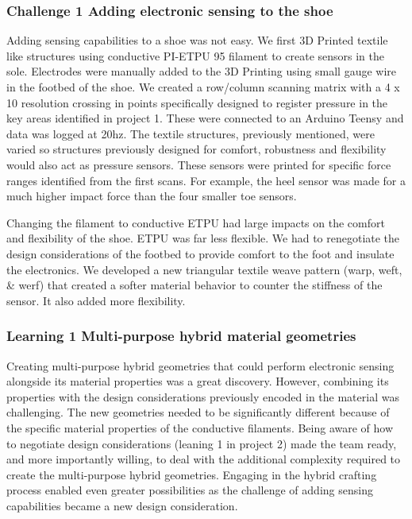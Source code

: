\subsubsection{Challenge 1 Adding electronic sensing to the shoe}

Adding sensing capabilities to a shoe was not easy. We first 3D Printed textile like structures using conductive PI-ETPU 95 filament to create sensors in the sole. Electrodes were manually added to the 3D Printing using small gauge wire in the footbed of the shoe. We created a row/column scanning matrix with a 4 x 10 resolution crossing in points specifically designed to register pressure in the key areas identified in project 1. These were connected to an Arduino Teensy and data was logged at 20hz. The textile structures, previously mentioned, were varied so structures previously designed for comfort, robustness and flexibility would also act as pressure sensors. These sensors were printed for specific force ranges identified from the first scans. For example, the heel sensor was made for a much higher impact force than the four smaller toe sensors.

Changing the filament to conductive ETPU had large impacts on the comfort and flexibility of the shoe. ETPU was far less flexible. We had to renegotiate the design considerations of the footbed to provide comfort to the foot and insulate the electronics. We developed a new triangular textile weave pattern (warp, weft, \& werf) that created a softer material behavior to counter the stiffness of the sensor. It also added more flexibility. 

\subsubsection{Learning 1 Multi-purpose hybrid material geometries}

Creating multi-purpose hybrid geometries that could perform electronic sensing alongside its material properties was a great discovery. However, combining its properties with the design considerations previously encoded in the material was challenging. The new  geometries needed to be significantly different because of the specific material properties of the conductive filaments. Being aware of how to negotiate design considerations (leaning 1 in project 2) made the team ready, and more importantly willing, to deal with the additional complexity required to create the multi-purpose hybrid geometries. Engaging in the hybrid crafting process enabled even greater possibilities as the challenge of adding sensing capabilities became a new design consideration. 


